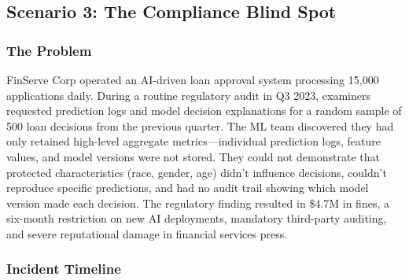 \subsection{Scenario 3: The Compliance Blind Spot}

\subsubsection{The Problem}

FinServe Corp operated an AI-driven loan approval system processing 15,000 applications daily. During a routine regulatory audit in Q3 2023, examiners requested prediction logs and model decision explanations for a random sample of 500 loan decisions from the previous quarter. The ML team discovered they had only retained high-level aggregate metrics---individual prediction logs, feature values, and model versions were not stored. They could not demonstrate that protected characteristics (race, gender, age) didn't influence decisions, couldn't reproduce specific predictions, and had no audit trail showing which model version made each decision. The regulatory finding resulted in \$4.7M in fines, a six-month restriction on new AI deployments, mandatory third-party auditing, and severe reputational damage in financial services press.

\subsubsection{Incident Timeline}

